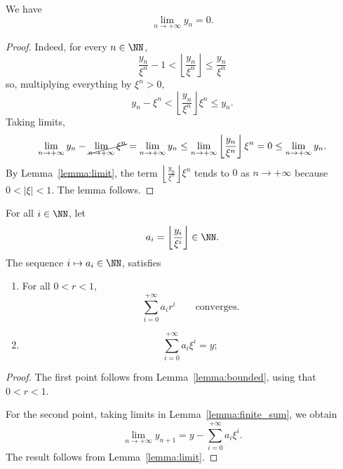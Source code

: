 \begin{lemma}\label{lemma:limit}
We have
\[
\lim_{n\to+\infty} y_n =0.
\]
\end{lemma}
\begin{proof}
Indeed, for every $n\in \NN$,
\[
\frac{y_n}{\xi^n} - 1 <\left\lfloor{\frac{y_n}{\xi^n}}\right\rfloor \le \frac{y_n}{\xi^n}
\]
so, multiplying everything by $\xi^n > 0$,
\[
y_n - \xi^n <\left\lfloor{\frac{y_n}{\xi^n}}\right\rfloor\xi^n \le y_n.
\]
Taking limits,
\[
\lim_{n\to+\infty}y_n-\cancel{\lim_{n\to+\infty}\xi^n}=\lim_{n\to+\infty}y_n\le \lim_{n\to+\infty}\left\lfloor\frac{y_n}{\xi^n}\right\rfloor\xi^n=0\le\lim_{n\to+\infty}y_n.
\]
By Lemma~\ref{lemma:limit}, the term $\left\lfloor\frac{y_n}{\xi^n}\right\rfloor\xi^n$  tends to $0$ as $n\to +\infty$ because $0<\lvert \xi\rvert< 1$. The lemma follows.
\end{proof}
\begin{proposition}
For all $i\in\NN$, let
\[
a_i=\left\lfloor\frac{y_i}{\xi^i}\right\rfloor \in \NN.
\]
The sequence $i\mapsto a_i\in \NN$, satisfies
\begin{enumerate}
\item For all $0<r <1$,
\[
\sum_{i=0}^{+\infty} a_i r^i \qquad\text{converges}.
\]
\item
\[
\sum_{i=0}^{+\infty} a_i\xi^i = y;
\]
\end{enumerate}
\end{proposition}
\begin{proof} 
The first point follows from Lemma~\ref{lemma:bounded}, using that $0<r<1$.

For the second point, taking limits in Lemma~\ref{lemma:finite_sum}, we obtain
\[
\lim_{n\to +\infty}y_{n+1}=y-\sum_{i=0}^{+\infty}a_i\xi^i.
\]
The result follows from Lemma~\ref{lemma:limit}.
\end{proof}